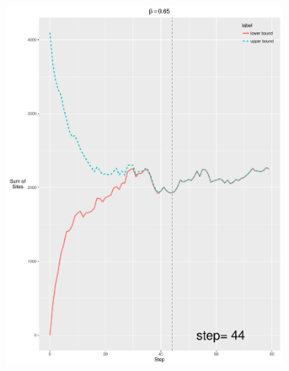 \documentclass[12pt, oneside]{article}   	%
\begin{document}
\begin{figure}[H]
\begin{subfigure}[b]{0.475\textwidth}
        \end{subfigure}
        \quad
        \begin{subfigure}[b]{0.475\textwidth}
            \centering
            \includegraphics[width=\textwidth, height=0.5\textheight]{065.pdf}
        \end{subfigure} \\
        \centering
        \begin{subfigure}[b]{0.475\textwidth}
            \centering

\end{subfigure}
\end{figure}
\end{document}
